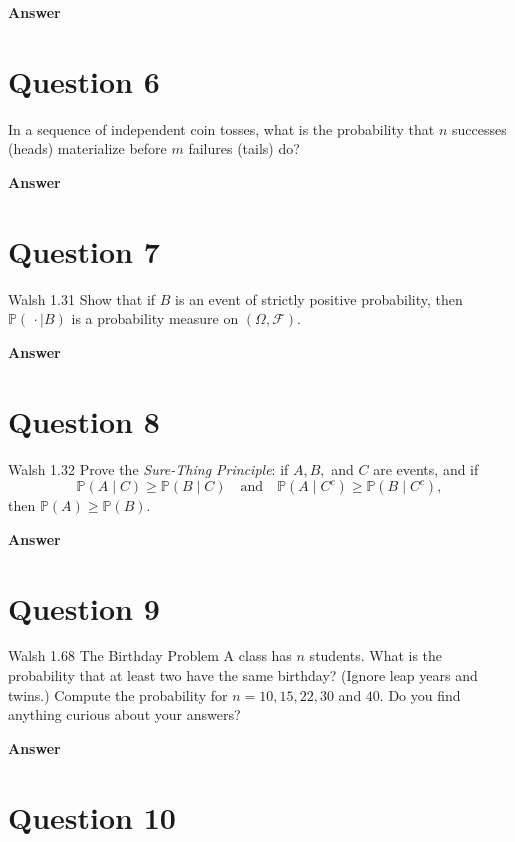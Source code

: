 \documentclass[letterpaper]{article}
\begin{document}
		\textbf{Answer}
		
		\clearpage
		
		\section{Question 6}
		
		 In a sequence of independent coin tosses, what is the probability that $n$ successes (heads) materialize before $m$ failures (tails) do?
		 
		 	\textbf{Answer}
		 
		 \clearpage
		
		
		
		\section{Question 7}
		{\color{deepred} Walsh 1.31} Show that if $B$ is an event of strictly positive probability, then
		$\mathbb{P}(\,\cdot \mid B)$ is a probability measure on $(\Omega,\mathcal{F})$.
		
		\textbf{Answer}
		
		\clearpage
		
		\section{Question 8}
		{\color{deepred} Walsh 1.32} Prove the \emph{Sure-Thing Principle}: if $A,B,$ and $C$ are events, and if
		\[
		\mathbb{P}(A \mid C) \ge \mathbb{P}(B \mid C)
		\quad \text{and} \quad
		\mathbb{P}(A \mid C^c) \ge \mathbb{P}(B \mid C^c),
		\]
		then $
		\mathbb{P}(A) \ge \mathbb{P}(B).$
		
		\textbf{Answer}
		
		\clearpage
		
		\section{Question 9}
		
		{\color{deepred} Walsh 1.68 The Birthday Problem} A class has $n$ students. What is the probability that at least two have the same birthday? (Ignore leap years and twins.) Compute the probability for $n = 10, 15, 22, 30$ and $40$. Do you find anything curious about your answers?
		
		\textbf{Answer}
		
		\clearpage
		
		\section{Question 10}
		
\end{document}

